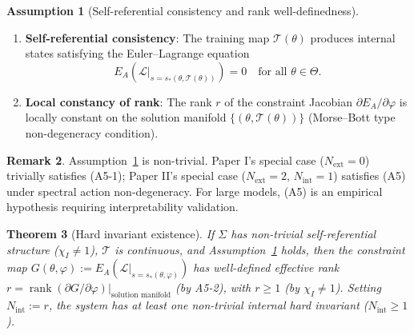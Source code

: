 \documentclass[12pt,a4paper]{article}
\newtheorem{theorem}{Theorem}[section]
\theoremstyle{definition}
\newtheorem{assumption}[theorem]{Assumption}
\newtheorem{remark}[theorem]{Remark}
\newcommand{\mL}{\mathcal{L}}
\newcommand{\mT}{\mathcal{T}}
\newcommand{\mTheta}{\Theta}
\newcommand{\chiI}{\chi_I}
\newcommand{\Nint}{N_{\mathrm{int}}}
\newcommand{\Next}{N_{\mathrm{ext}}}
\newcommand{\rank}{\operatorname{rank}}
\begin{document}
\begin{assumption}[Self-referential consistency and rank well-definedness]
\label{ass:a5}
\begin{enumerate}[label=(A5-\arabic*)]
\item \textbf{Self-referential consistency}: The training map $\mT(\theta)$ produces internal states satisfying the Euler--Lagrange equation
\[ E_A(\mL|_{s = s_*(\theta, \mT(\theta))}) = 0 \quad \text{for all } \theta \in \mTheta. \]
\item \textbf{Local constancy of rank}: The rank $r$ of the constraint Jacobian $\partial E_A / \partial \varphi$ is locally constant on the solution manifold $\{(\theta, \mT(\theta))\}$ (Morse--Bott type non-degeneracy condition).
\end{enumerate}
\end{assumption}

\begin{remark}
Assumption~\ref{ass:a5} is non-trivial. Paper I's special case ($\Next = 0$) trivially satisfies (A5-1); Paper II's special case ($\Next = 2$, $\Nint = 1$) satisfies (A5) under spectral action non-degeneracy. For large models, (A5) is an empirical hypothesis requiring interpretability validation.
\end{remark}

\begin{theorem}[Hard invariant existence]
\label{thm:inv-exist}
If $\Sigma$ has non-trivial self-referential structure ($\chiI \neq 1$), $\mT$ is continuous, and Assumption~\ref{ass:a5} holds, then the constraint map $G(\theta, \varphi) := E_A(\mL|_{s = s_*(\theta, \varphi)})$ has well-defined effective rank $r = \rank(\partial G / \partial \varphi)|_{\text{solution manifold}}$ (by A5-2), with $r \geq 1$ (by $\chiI \neq 1$). Setting $\Nint := r$, the system has at least one non-trivial internal hard invariant ($\Nint \geq 1$).
\end{theorem}
\end{document}
